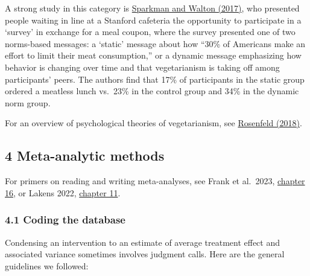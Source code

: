 \documentclass[
  letterpaper,
  DIV=11,
  numbers=noendperiod]{scrartcl}
\begin{document}
A strong study in this category is
\href{https://journals.sagepub.com/doi/10.1177/0956797617719950}{Sparkman
and Walton (2017)}, who presented people waiting in line at a Stanford
cafeteria the opportunity to participate in a `survey' in exchange for a
meal coupon, where the survey presented one of two norms-based messages:
a `static' message about how ``30\% of Americans make an effort to limit
their meat consumption,'' or a dynamic message emphasizing how behavior
is changing over time and that vegetarianism is taking off among
participants' peers. The authors find that 17\% of participants in the
static group ordered a meatless lunch vs.~23\% in the control group and
34\% in the dynamic norm group.

For an overview of psychological theories of vegetarianism, see
\href{https://www.sciencedirect.com/science/article/abs/pii/S0195666318309309}{Rosenfeld
(2018)}.

\hypertarget{meta-analytic-methods}{%
\subsection{4 Meta-analytic methods}\label{meta-analytic-methods}}

For primers on reading and writing meta-analyses, see Frank et al.~2023,
\href{https://experimentology.io/016-meta.html}{chapter 16}, or Lakens
2022,
\href{https://lakens.github.io/statistical_inferences/11-meta.html}{chapter
11}.

\hypertarget{coding-the-database}{%
\subsubsection{4.1 Coding the database}\label{coding-the-database}}

Condensing an intervention to an estimate of average treatment effect
and associated variance sometimes involves judgment calls. Here are the
general guidelines we followed:
\end{document}
